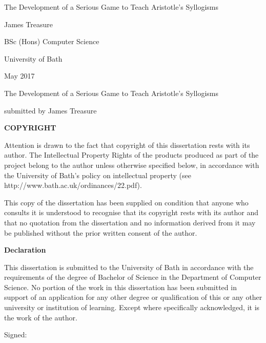 \documentclass[12pt,a4paper]{report}
\begin{document}
\begin{titlepage}\centering
\vspace*{\fill}
\LARGE The Development of a Serious Game to Teach Aristotle's Syllogisms\par
\vspace{0.5cm}
\normalsize James Treasure\par
\vspace{0.5cm}
\normalsize	BSc (Hons) Computer Science\par
\normalsize	University of Bath\par
\normalsize	May 2017
\vspace*{\fill}

\end{titlepage}

\begin{titlepage}
\vspace*{\fill}


The Development of a Serious Game to Teach Aristotle's Syllogisms

submitted by James Treasure
\vspace{0.5cm}

{\large{\textbf{COPYRIGHT}}}

Attention is drawn to the fact that copyright of this dissertation rests with its author. The Intellectual Property Rights of the products produced as part of the
project belong to the author unless otherwise specified below, in accordance with
the University of Bath's policy on intellectual property
(see http://www.bath.ac.uk/ordinances/22.pdf).

This copy of the dissertation has been supplied on condition that anyone who
consults it is understood to recognise that its copyright rests with its author and
that no quotation from the dissertation and no information derived from it may
be published without the prior written consent of the author.
\vspace{0.5cm}

{\large{\textbf{Declaration}}}

This dissertation is submitted to the University of Bath in accordance with the
requirements of the degree of Bachelor of Science in the Department of Computer
Science. No portion of the work in this dissertation has been submitted in support
of an application for any other degree or qualification of this or any other
university or institution of learning. Except where specifically acknowledged, it is
the work of the author.

\vspace{0.5cm}

Signed:

\vspace*{\fill}

\end{titlepage}
\end{document}
